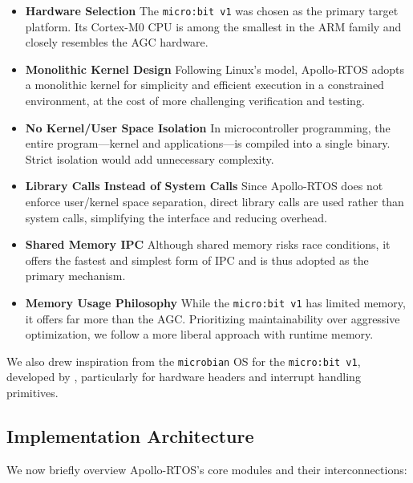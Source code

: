 \begin{itemize}[left=0pt]
    \item \textbf{Hardware Selection} The \texttt{micro:bit v1} was chosen as the
        primary target platform. Its Cortex-M0 CPU is among the smallest in the ARM
        family and closely resembles the AGC hardware. 

    \item \textbf{Monolithic Kernel Design} Following Linux's model, Apollo-RTOS adopts a
        monolithic kernel for simplicity and efficient execution in a constrained
        environment, at the cost of more challenging verification and testing.

    \item \textbf{No Kernel/User Space Isolation} In microcontroller programming, the entire
        program---kernel and applications---is compiled into a single binary. Strict
        isolation would add unnecessary complexity.

    \item \textbf{Library Calls Instead of System Calls} Since Apollo-RTOS does not enforce
        user/kernel space separation, direct library calls are used rather than
        system calls, simplifying the interface and reducing overhead.

    \item \textbf{Shared Memory IPC} Although shared memory risks race conditions, it offers
        the fastest and simplest form of IPC and is thus adopted as the primary
        mechanism.

    \item \textbf{Memory Usage Philosophy} While the \texttt{micro:bit v1} has limited
        memory, it offers far more than the AGC. Prioritizing maintainability over
        aggressive optimization, we follow a more liberal approach with runtime memory. 
\end{itemize}


We also drew inspiration from the \texttt{microbian} OS for the \texttt{micro:bit v1},
developed by \citet{microbian}, particularly for hardware headers and interrupt
handling primitives.

\subsection{Implementation Architecture}

We now briefly overview Apollo-RTOS's core modules and their interconnections:

